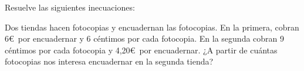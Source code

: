 \documentclass[addpoints,spanish, 12pt,a4paper]{exam}
\begin{document}
\begin{questions}
\question Resuelve las siguientes inecuaciones:
\begin{parts}

\part[2]$ x^2 - x - 6 \geqslant 0  $  
\begin{solution} $ \left[-2, 3\right]$ \end{solution}

\part[2]$x^{3} - 2 x^{2} - 3 x < 0$  
\begin{solution} $\left(-\infty, -1\right) \cup \left(0, 3\right)$ \end{solution}

\part[2]$\dfrac{x^{2} - x}{x + 1}\geqslant 0$  
\begin{solution} $\left(-1, 0\right] \cup \left[1, \infty\right)$ \end{solution}

\part[2]  $\left| {2x - 12} \right| > 2$ 
\begin{solution} $\left(-\infty, 5\right) \cup \left(7, \infty\right) $ \end{solution}

\end{parts}

\addpoints

\question Dos tiendas hacen fotocopias y encuadernan las fotocopias. En la primera, cobran 6\euro\ por encuadernar y 6 céntimos por cada fotocopia. En la segunda cobran 9 céntimos por cada fotocopia y 4,20\euro\ por encuadernar. ¿A partir de cuántas fotocopias nos interesa encuadernar en la segunda tienda?
\begin{parts} 

\end{parts}
\end{questions}
\end{document}
